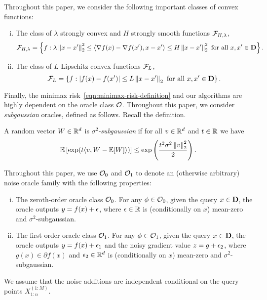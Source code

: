 Throughout this paper,  we consider the following important classes
of convex functions:
\begin{enumerate}[i.]
\item The class of $\lambda$ strongly convex and $H$ strongly smooth 
  functions $\mathcal{F}_{H, \lambda}$,
  \begin{equation*}
    \mathcal{F}_{H, \lambda} = \left\{f: \lambda \left\|{x-x^\prime}\right\|_2^2 \leq 
    \left<\nabla f(x) - \nabla f(x^\prime), x - x^\prime\right> \leq 
    H\left\|{x-x^\prime}\right\|_2^2 ~\text{for all}~x, x^\prime \in \mathbf{D}\right\}.
  \end{equation*}
\item The class of $L$ Lipschitz convex functions $\mathcal{F}_L$,
\begin{equation*}
\mathcal{F}_{L} = \left\{f: \left|f(x) - f(x^\prime)\right| \leq L
\left\|{x-x^\prime}\right\|_2 ~\text{for all}~x, x^\prime \in \mathbf{D}\right\}.
\end{equation*}
\end{enumerate}
Finally, the minimax risk~\eqref{eqn:minimax-risk-definition} and our
algorithms are highly dependent on the oracle class $\mathcal{O}$. Throughout this
paper, we consider \emph{subgaussian} oracles, defined as follows. Recall
the definition.
\begin{definition}
  A random vector $W \in \mathbb{R}^d$ is \emph{$\sigma^2$-subgaussian} if
  for all $v \in \mathbb{R}^d$ and $t \in \mathbb{R}$ we have
  \begin{equation*}
    \mathbb{E}\left[\exp(t\langle v, W - \mathbb{E}[W]\rangle)\right]
    \le \exp\left(\frac{t^2 \sigma^2 \left\|{v}\right\|_2^2}{2} \right).
  \end{equation*} 
\end{definition}
Throughout this paper, we use $\mathcal{O}_0$ and $\mathcal{O}_1$ to denote an
(otherwise arbitrary) noise oracle family with the following properties:
\begin{enumerate}[i.]
\item The zeroth-order oracle class $\mathcal{O}_0$. For any $\phi \in \mathcal{O}_0$, given
  the query $x \in \mathbf{D}$, the oracle outputs $y =
  f(x) + \epsilon$, where $\epsilon\in \mathbb{R}$ is (conditionally on $x$)
  mean-zero and $\sigma^2$-subgaussian.
\item The first-order oracle class $\mathcal{O}_1$. For any $\phi \in \mathcal{O}_1$, given
  the query $x \in \mathbf{D}$, the oracle outputs
  $y = f(x) + \epsilon_1$ and the noisy gradient value $z = g + \epsilon_2$, where $g(x) \in \partial f(x)$ and $\epsilon_2 \in \mathbb{R}^d$ is (conditionally on $x$)
  mean-zero and $\sigma^2$-subgaussian.
\end{enumerate}
\noindent
We assume that the noise additions are independent conditional
on the query points $X_{1:n}^{(1:M)}$.
%

